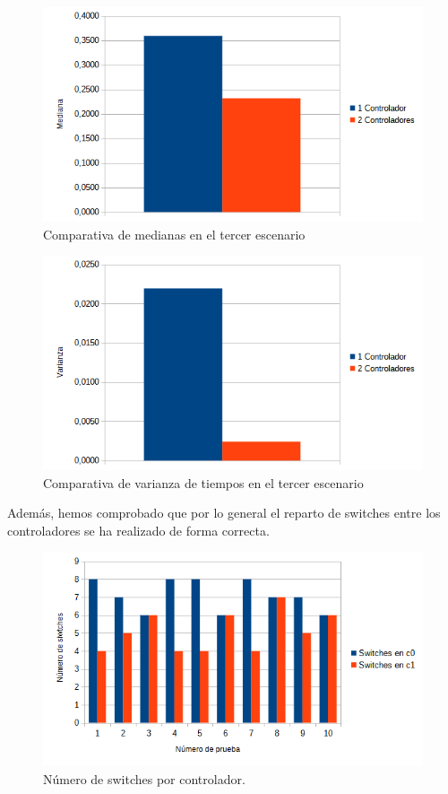 \documentclass[a4paper, 12pt]{book}
\begin{document}
	\begin{figure}[H]
		\centering
		\includegraphics[width=12cm, keepaspectratio]{img/comparativamedianaescenario3}
		\caption{Comparativa de medianas en el tercer escenario}
		\label{figura:medianab4}
	\end{figure}
	
	\begin{figure}[H]
		\centering
		\includegraphics[width=12cm, keepaspectratio]{img/comparativavarianzaescenario3}
		\caption{Comparativa de varianza de tiempos en el tercer escenario}
		\label{figura:varianzab4}
	\end{figure}
	
	
	Además, hemos comprobado que por lo general el reparto de switches entre los controladores se ha realizado de forma correcta.
	
	
	\begin{figure}[H]
		\centering
		\includegraphics[width=16cm, keepaspectratio]{img/switchesporcontrollerescenario3}
		\caption{Número de switches por controlador.}
		\label{figura:switchesporcontrollerb4}
	\end{figure}
	
\end{document}
